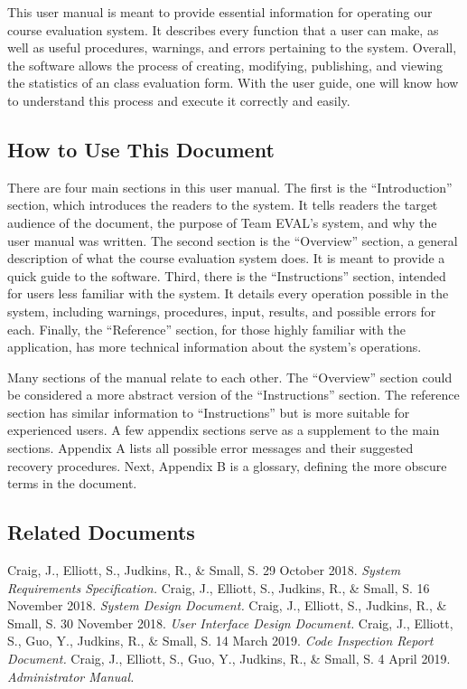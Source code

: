 \documentclass{article}
\begin{document}
This user manual is meant to provide essential information for operating our course evaluation system. It describes every function that a user can make, as well as useful procedures, warnings, and errors pertaining to the system. Overall, the software allows the process of creating, modifying, publishing, and viewing the statistics of an class evaluation form. With the user guide, one will know how to understand this process and execute it correctly and easily.

\subsection{How to Use This Document}

There are four main sections in this user manual. The first is the ``Introduction'' section, which introduces the readers to the system. It tells readers the target audience of the document, the purpose of Team EVAL's system, and why the user manual was written. The second section is the ``Overview'' section, a general description of what the course evaluation system does. It is meant to provide a quick guide to the software. Third, there is the ``Instructions'' section, intended for users less familiar with the system. It details every operation possible in the system, including warnings, procedures, input, results, and possible errors for each. Finally, the ``Reference'' section, for those highly familiar with the application, has more technical information about the system's operations.

Many sections of the manual relate to each other. The ``Overview'' section could be considered a more abstract version of the ``Instructions'' section. The reference section has similar information to ``Instructions'' but is more suitable for experienced users. A few appendix sections serve as a supplement to the main sections. Appendix A lists all possible error messages and their suggested recovery procedures. Next, Appendix B is a glossary, defining the more obscure terms in the document.

\subsection{Related Documents}

Craig, J., Elliott, S., Judkins, R., \& Small, S. 29 October 2018. \textit{System Requirements Specification.}
\vspace{3mm}\newline
Craig, J., Elliott, S., Judkins, R., \& Small, S. 16 November 2018. \textit{System Design Document.}
\vspace{3mm}\newline
Craig, J., Elliott, S., Judkins, R., \& Small, S. 30 November 2018. \textit{User Interface Design Document.}
\vspace{3mm}\newline
Craig, J., Elliott, S., Guo, Y., Judkins, R., \& Small, S. 14 March 2019. \textit{Code Inspection Report Document.}
\vspace{3mm}\newline
Craig, J., Elliott, S., Guo, Y., Judkins, R., \& Small, S. 4 April 2019. \textit{Administrator Manual.}
\end{document}
